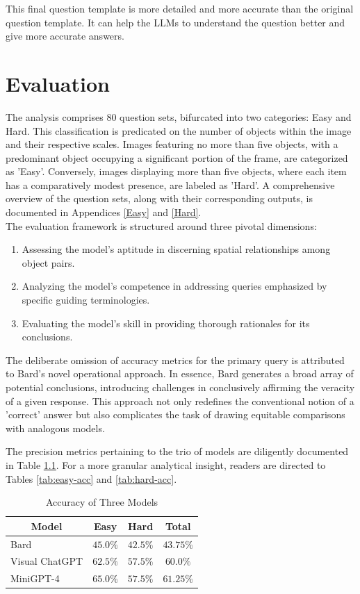 \documentclass[twocolumn,11pt]{report}
\begin{document}
This final question template is more detailed and more accurate than the original question template. It can help the LLMs to understand the question better and give more accurate answers.\\




\chapter{Evaluation}\label{chap:evaluation}
The analysis comprises 80 question sets, bifurcated into two categories: Easy and Hard. This classification is predicated on the number of objects within the image and their respective scales. Images featuring no more than five objects, with a predominant object occupying a significant portion of the frame, are categorized as 'Easy'. Conversely, images displaying more than five objects, where each item has a comparatively modest presence, are labeled as 'Hard'. A comprehensive overview of the question sets, along with their corresponding outputs, is documented in Appendices \ref{Easy} and \ref{Hard}.\\
The evaluation framework is structured around three pivotal dimensions:
\begin{enumerate}
\item Assessing the model's aptitude in discerning spatial relationships among object pairs.
\item Analyzing the model's competence in addressing queries emphasized by specific guiding terminologies.
\item Evaluating the model's skill in providing thorough rationales for its conclusions.
\end{enumerate}
The deliberate omission of accuracy metrics for the primary query is attributed to Bard's novel operational approach. In essence, Bard generates a broad array of potential conclusions, introducing challenges in conclusively affirming the veracity of a given response. This approach not only redefines the conventional notion of a 'correct' answer but also complicates the task of drawing equitable comparisons with analogous models.

The precision metrics pertaining to the trio of models are diligently documented in Table \ref{tab:accuracy}. For a more granular analytical insight, readers are directed to Tables \ref{tab:easy-acc} and \ref{tab:hard-acc}.
\begin{table}[h]
    \centering
    \caption{Accuracy of Three Models}
    \label{tab:accuracy}
    \begin{tabular}{@{}lccc@{}}
    \toprule
    \multicolumn{1}{c}{Model} & Easy      & Hard & Total \\ \midrule
    Bard                      &  $45.0\%$ & $42.5\%$ &  $43.75\%$ \\
    Visual ChatGPT            &  $62.5\%$ & $57.5\%$ &  $60.0\%$  \\
    MiniGPT-4                 &  $65.0\%$ & $57.5\%$ &  $61.25\%$  \\ \bottomrule
    \end{tabular}
\end{table}
\end{document}
